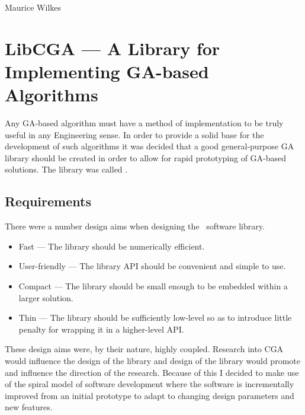 \begin{savequote}[0.5\paperwidth]
%
{Maurice Wilkes}
\end{savequote}

\chapter{LibCGA --- A Library for Implementing GA-based Algorithms}

Any GA-based algorithm must have a method of implementation to be
truly useful in any Engineering sense. In order to provide a solid
base for the development of such algorithms it was decided that
a good general-purpose GA library should be created in order to 
allow for rapid prototyping of GA-based solutions. The library 
was called \libcga{}.

\section{Requirements}

There were a number design aims when designing the \libcga\ software library.

\begin{itemize}
\item Fast --- The library should be numerically efficient.
\item User-friendly --- The library API should be convenient and simple to use.
\item Compact --- The library should be small enough to be embedded within
a larger solution.
\item Thin --- The library should be sufficiently low-level so as to introduce
little penalty for wrapping it in a higher-level API.
\end{itemize}

These design aims were, by their nature, highly coupled. Research into
CGA would influence the design of the library and design of the library would
promote and influence the direction of the research. Because of this
I decided to make use of the spiral model of software development where
the software is incrementally improved from an initial prototype to adapt
to changing design parameters and new features.

